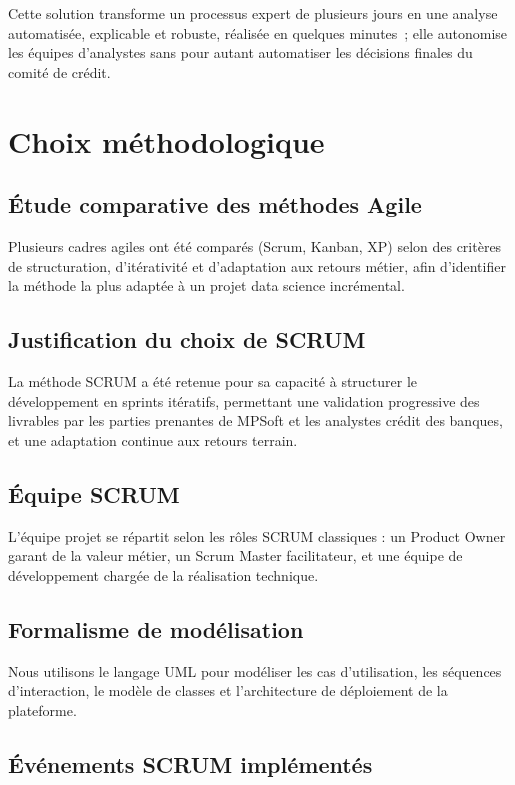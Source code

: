 \documentclass[a4paper,12pt,oneside]{report}
\begin{document}
Cette solution transforme un processus expert de plusieurs jours en une analyse automatisée,
explicable et robuste, réalisée en quelques minutes~; elle autonomise les équipes
d'analystes sans pour autant automatiser les décisions finales du comité de crédit.

\section{Choix méthodologique}

\subsection{Étude comparative des méthodes Agile}

Plusieurs cadres agiles ont été comparés (Scrum, Kanban, XP) selon des critères de
structuration, d'itérativité et d'adaptation aux retours métier, afin d'identifier la
méthode la plus adaptée à un projet data science incrémental.

\subsection{Justification du choix de SCRUM}

La méthode SCRUM a été retenue pour sa capacité à structurer le développement en sprints
itératifs, permettant une validation progressive des livrables par les parties prenantes
de MPSoft et les analystes crédit des banques, et une adaptation continue aux retours terrain.

\subsection{Équipe SCRUM}

L'équipe projet se répartit selon les rôles SCRUM classiques : un Product Owner garant de
la valeur métier, un Scrum Master facilitateur, et une équipe de développement chargée de
la réalisation technique.

\subsection{Formalisme de modélisation}

Nous utilisons le langage UML pour modéliser les cas d'utilisation, les séquences
d'interaction, le modèle de classes et l'architecture de déploiement de la plateforme.

\subsection{Événements SCRUM implémentés}
\end{document}

